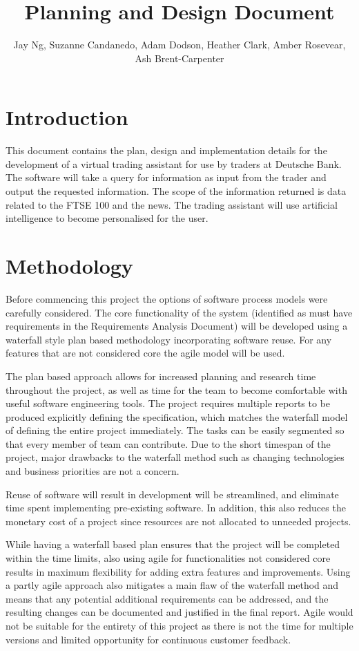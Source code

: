 \documentclass[]{IEEEtran}
\title{Planning and Design Document}
\author{Jay Ng, Suzanne Candanedo, Adam Dodson, Heather Clark, Amber Rosevear, Ash Brent-Carpenter}
\begin{document}
	\maketitle
	\section{Introduction}
	This document contains the plan, design and implementation details for the development of a virtual trading assistant for use by traders at Deutsche Bank. The software will take a query for information as input from the trader and output the requested information. The scope of the information returned is data related to the FTSE 100 and the news. The trading assistant will use artificial intelligence to become personalised for the user.
	
	\section{Methodology}
	Before commencing this project the options of software process models were carefully considered. The core functionality of the system (identified as must have requirements in the Requirements Analysis Document) will be developed using a waterfall style plan based methodology incorporating software reuse. For any features that are not considered core the agile model will be used.
	
	The plan based approach allows for increased planning and research time throughout the project, as well as time for the team to become comfortable with useful software engineering tools. The project requires multiple reports to be produced explicitly defining the specification, which matches the waterfall model of defining the entire project immediately. The tasks can be easily segmented so that every member of team can contribute. Due to the short timespan of the project, major drawbacks to the waterfall method such as changing technologies and business priorities are not a concern.
	
	Reuse of software will result in development will be streamlined, and eliminate time spent implementing pre-existing software. In addition, this also reduces the monetary cost of a project since resources are not allocated to unneeded projects.
	
	While having a waterfall based plan ensures that the project will be completed within the time limits, also using agile for functionalities not considered core results in maximum flexibility for adding extra features and improvements. Using a partly agile approach also mitigates a main flaw of the waterfall method and means that any potential additional requirements can be addressed, and the resulting changes can be documented and justified in the final report. Agile would not be suitable for the entirety of this project as there is not the time for multiple versions and limited opportunity for continuous customer feedback. 
	
\end{document}
